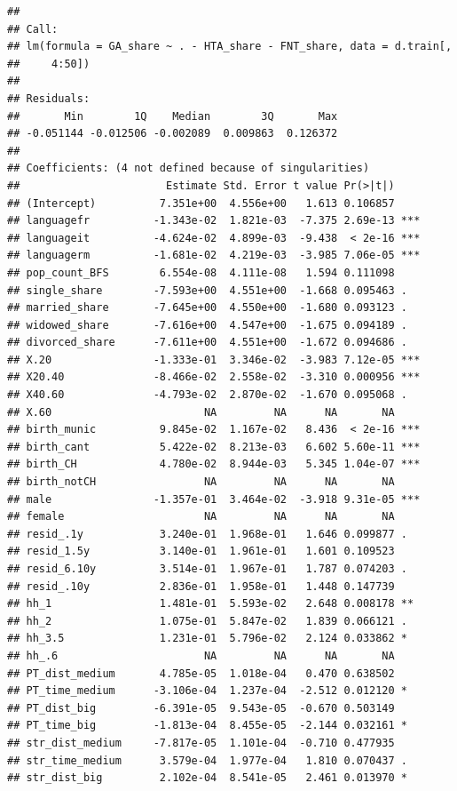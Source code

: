\documentclass[
]{article}
\begin{document}
\begin{verbatim}
## 
## Call:
## lm(formula = GA_share ~ . - HTA_share - FNT_share, data = d.train[, 
##     4:50])
## 
## Residuals:
##       Min        1Q    Median        3Q       Max 
## -0.051144 -0.012506 -0.002089  0.009863  0.126372 
## 
## Coefficients: (4 not defined because of singularities)
##                       Estimate Std. Error t value Pr(>|t|)    
## (Intercept)          7.351e+00  4.556e+00   1.613 0.106857    
## languagefr          -1.343e-02  1.821e-03  -7.375 2.69e-13 ***
## languageit          -4.624e-02  4.899e-03  -9.438  < 2e-16 ***
## languagerm          -1.681e-02  4.219e-03  -3.985 7.06e-05 ***
## pop_count_BFS        6.554e-08  4.111e-08   1.594 0.111098    
## single_share        -7.593e+00  4.551e+00  -1.668 0.095463 .  
## married_share       -7.645e+00  4.550e+00  -1.680 0.093123 .  
## widowed_share       -7.616e+00  4.547e+00  -1.675 0.094189 .  
## divorced_share      -7.611e+00  4.551e+00  -1.672 0.094686 .  
## X.20                -1.333e-01  3.346e-02  -3.983 7.12e-05 ***
## X20.40              -8.466e-02  2.558e-02  -3.310 0.000956 ***
## X40.60              -4.793e-02  2.870e-02  -1.670 0.095068 .  
## X.60                        NA         NA      NA       NA    
## birth_munic          9.845e-02  1.167e-02   8.436  < 2e-16 ***
## birth_cant           5.422e-02  8.213e-03   6.602 5.60e-11 ***
## birth_CH             4.780e-02  8.944e-03   5.345 1.04e-07 ***
## birth_notCH                 NA         NA      NA       NA    
## male                -1.357e-01  3.464e-02  -3.918 9.31e-05 ***
## female                      NA         NA      NA       NA    
## resid_.1y            3.240e-01  1.968e-01   1.646 0.099877 .  
## resid_1.5y           3.140e-01  1.961e-01   1.601 0.109523    
## resid_6.10y          3.514e-01  1.967e-01   1.787 0.074203 .  
## resid_.10y           2.836e-01  1.958e-01   1.448 0.147739    
## hh_1                 1.481e-01  5.593e-02   2.648 0.008178 ** 
## hh_2                 1.075e-01  5.847e-02   1.839 0.066121 .  
## hh_3.5               1.231e-01  5.796e-02   2.124 0.033862 *  
## hh_.6                       NA         NA      NA       NA    
## PT_dist_medium       4.785e-05  1.018e-04   0.470 0.638502    
## PT_time_medium      -3.106e-04  1.237e-04  -2.512 0.012120 *  
## PT_dist_big         -6.391e-05  9.543e-05  -0.670 0.503149    
## PT_time_big         -1.813e-04  8.455e-05  -2.144 0.032161 *  
## str_dist_medium     -7.817e-05  1.101e-04  -0.710 0.477935    
## str_time_medium      3.579e-04  1.977e-04   1.810 0.070437 .  
## str_dist_big         2.102e-04  8.541e-05   2.461 0.013970 *  

\end{verbatim}
\end{document}
